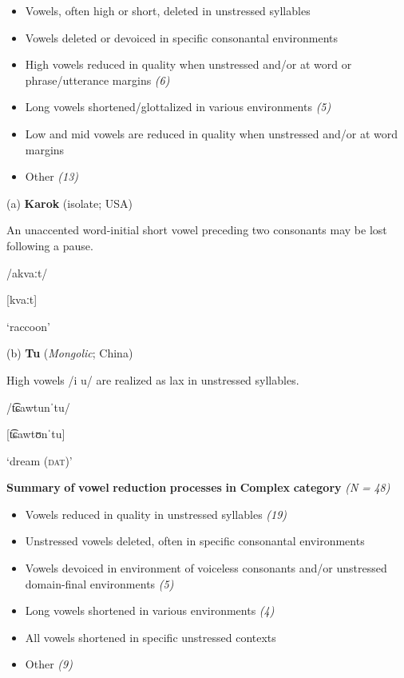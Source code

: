\begin{itemize}
\item 
Vowels, often high or short, deleted in unstressed syllables \textit{}

\item 
Vowels deleted or devoiced in specific consonantal environments \textit{}

\item 
High vowels reduced in quality when unstressed and/or at word or phrase/utterance margins \textit{(6)}

\item 
Long vowels shortened/glottalized in various environments \textit{(5)}

\item 
Low and mid vowels are reduced in quality when unstressed and/or at word margins \textit{}

\item 
Other \textit{(13)}

\end{itemize}

(a)   \textbf{Karok} (isolate; USA)

An unaccented word-initial short vowel preceding two consonants may be lost following a pause.

/akvaːt/

[kvaːt]

\glt ‘raccoon’

\citep[53]{Bright1957}

(b)  \textbf{Tu} (\textit{Mongolic}; China)

High vowels /i u/ are realized as lax in unstressed syllables. 

/t͡ɕawtunˈtu/

[t͡ɕawtʊnˈtu]

\glt ‘dream (\textsc{dat})’

\citep[35]{Slater2003}
\z

\ea\label{ex:(6.18)}
  \textbf{Summary} \textbf{of} \textbf{vowel} \textbf{reduction} \textbf{processes} \textbf{in} \textbf{Complex} \textbf{category} \textit{(N} \textit{=} \textit{48)}

\begin{itemize}
\item 
Vowels reduced in quality in unstressed syllables \textit{(19)}

\item 
Unstressed vowels deleted, often in specific consonantal environments \textit{}

\item 
Vowels devoiced in environment of voiceless consonants and/or unstressed domain-final environments \textit{(5)}

\item 
Long vowels shortened in various environments \textit{(4)}

\item 
All vowels shortened in specific unstressed contexts \textit{}

\item 
Other \textit{(9)}

\end{itemize}

